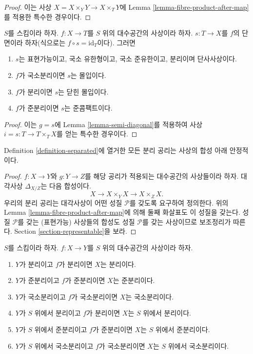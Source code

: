 \begin{proof}
이는 사상 $X = X \times_Y Y \to X \times_T Y$에
Lemma \ref{lemma-fibre-product-after-map}를 적용한 특수한 경우이다.
\end{proof}

\begin{lemma}
\label{lemma-section-immersion}
$S$를 스킴이라 하자.
$f : X \to T$를 $S$ 위의 대수공간의 사상이라 하자.
$s : T \to X$를 $f$의 단면이라 하자(식으로는
$f \circ s = \text{id}_T$이다). 그러면
\begin{enumerate}
\item $s$는 표현가능이고, 국소 유한형이고, 국소 준유한이고,
분리이며 단사사상이다.
\item $f$가 국소분리이면 $s$는 몰입이다.
\item $f$가 분리이면 $s$는 닫힌 몰입이다.
\item $f$가 준분리이면 $s$는 준콤팩트이다.
\end{enumerate}
\end{lemma}

\begin{proof}
이는 $g = s$에 Lemma \ref{lemma-semi-diagonal}를 적용하여
사상 $i = s : T \to T \times_T X$를 얻는 특수한 경우이다.
\end{proof}

\begin{lemma}
\label{lemma-composition-separated}
Definition \ref{definition-separated}에 열거한 모든 분리 공리는
사상의 합성 아래 안정적이다.
\end{lemma}

\begin{proof}
$f : X \to Y$와 $g : Y \to Z$를 해당 공리가 적용되는 대수공간의
사상들이라 하자. 대각사상 $\Delta_{X/Z}$는 다음 합성이다.
$$
X \longrightarrow X \times_Y X \longrightarrow X \times_Z X.
$$
우리의 분리 공리는 대각사상이 어떤 성질 $\mathcal{P}$를 갖도록
요구하여 정의한다. 위의 Lemma \ref{lemma-fibre-product-after-map}에
의해 둘째 화살표도 이 성질을 갖는다.
성질 $\mathcal{P}$를 갖는 (표현가능) 사상들의 합성도
성질 $\mathcal{P}$를 갖는 사상이므로 보조정리가 따른다.
Section \ref{section-representable}을 보라.
\end{proof}

\begin{lemma}
\label{lemma-separated-over-separated}
$S$를 스킴이라 하자.
$f : X \to Y$를 $S$ 위의 대수공간의 사상이라 하자.
\begin{enumerate}
\item $Y$가 분리이고 $f$가 분리이면 $X$는 분리이다.
\item $Y$가 준분리이고 $f$가 준분리이면 $X$는 준분리이다.
\item $Y$가 국소분리이고 $f$가 국소분리이면 $X$는 국소분리이다.
\item $Y$가 $S$ 위에서 분리이고 $f$가 분리이면
$X$는 $S$ 위에서 분리이다.
\item $Y$가 $S$ 위에서 준분리이고 $f$가 준분리이면
$X$는 $S$ 위에서 준분리이다.
\item $Y$가 $S$ 위에서 국소분리이고 $f$가 국소분리이면
$X$는 $S$ 위에서 국소분리이다.
\end{enumerate}
\end{lemma}

